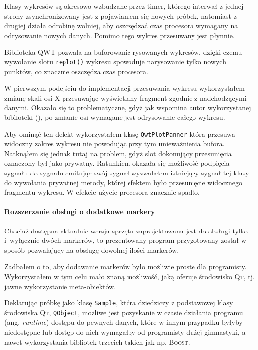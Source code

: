 Klasy wykresów są okresowo wzbudzane przez timer, którego interwał z jednej strony zsynchronizowany jest z pojawianiem się nowych próbek, natomiast z drugiej działa odrobinę wolniej, aby oszczędzać czas procesora wymagany na odrysowanie nowych danych. Pomimo tego wykres przesuwany jest płynnie.

Biblioteka \textsc{QWT} pozwala na buforowanie rysowanych wykresów, dzięki czemu wywołanie slotu \verb|replot()| wykresu spowoduje narysowanie tylko nowych punktów, co znacznie oszczędza czas procesora.

W pierwszym podejściu do implementacji przesuwania wykresu wykorzystałem zmianę skali osi X przesuwając wyświetlany fragment zgodnie z nadchodzącymi danymi. Okazało się to problematyczne, gdyż jak wspomina autor wykorzystanej biblioteki (\citep{UweRathmannNewsgroup}), po zmianie osi wymagane jest odrysowanie całego wykresu.

Aby ominąć ten defekt wykorzystałem klasę \verb|QwtPlotPanner| która przesuwa widoczny zakres wykresu nie powodując przy tym unieważnienia bufora. Natknąłem się jednak tutaj na problem, gdyż slot dokonujący przesunięcia oznaczony był jako prywatny. Ratunkiem okazała się możliwość podpięcia sygnału do sygnału \ppauza emitując swój sygnał wyzwalałem istniejący sygnał tej klasy do wywołania prywatnej metody, której efektem było przesunięcie widocznego fragmentu wykresu. W efekcie użycie procesora znacznie spadło.

\paragraph{Rozszerzanie obsługi o dodatkowe markery}
Chociaż dostępna aktualnie wersja sprzętu zaprojektowana jest do obsługi tylko i~wyłącznie dwóch markerów, to prezentowany program przygotowany został w sposób pozwalający na obsługę dowolnej ilości markerów.

Zadbałem o to, aby dodawanie markerów było możliwie proste dla programisty. Wykorzystałem w tym celu mało znaną możliwość, jaką oferuje środowisko \textsc{Qt}, tj. jawne wykorzystanie meta-obiektów.

Deklarując próbkę jako klasę \verb|Sample|, która dziedziczy z podstawowej klasy środowiska \textsc{Qt}, \verb|QObject|, możliwe jest pozyskanie w czasie działania programu (ang. \textsl{runtime}) dostępu do pewnych danych, które w innym przypadku byłyby niedostępne lub dostęp do nich wymagałby od programisty dużej gimnastyki, a nawet wykorzystania bibliotek trzecich takich jak np. \textsc{Boost}.


